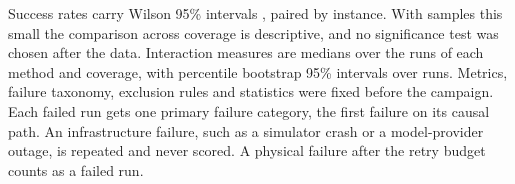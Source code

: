 Success rates carry Wilson 95\% intervals \citep{wilson1927probable}, paired by instance. With samples this small the
comparison across coverage is descriptive, and no significance test was chosen after the data. Interaction measures are
medians over the runs of each method and coverage, with percentile bootstrap 95\% intervals over runs. Metrics, failure taxonomy, exclusion rules and statistics were fixed
before the campaign. Each failed run gets one primary failure category, the first failure on its causal path. An
infrastructure failure, such as a simulator crash or a model-provider outage, is repeated and never scored. A physical
failure after the retry budget counts as a failed run.

